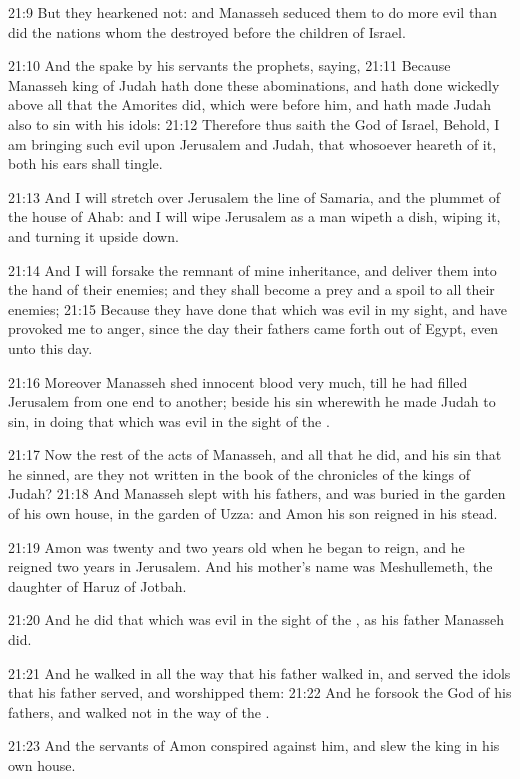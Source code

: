 21:9 But they hearkened not: and Manasseh seduced them to do more evil
than did the nations whom the \LORD destroyed before the children of
Israel.

21:10 And the \LORD spake by his servants the prophets, saying, 21:11
Because Manasseh king of Judah hath done these abominations, and hath
done wickedly above all that the Amorites did, which were before him,
and hath made Judah also to sin with his idols: 21:12 Therefore thus
saith the \LORD God of Israel, Behold, I am bringing such evil upon
Jerusalem and Judah, that whosoever heareth of it, both his ears shall
tingle.

21:13 And I will stretch over Jerusalem the line of Samaria, and the
plummet of the house of Ahab: and I will wipe Jerusalem as a man
wipeth a dish, wiping it, and turning it upside down.

21:14 And I will forsake the remnant of mine inheritance, and deliver
them into the hand of their enemies; and they shall become a prey and
a spoil to all their enemies; 21:15 Because they have done that which
was evil in my sight, and have provoked me to anger, since the day
their fathers came forth out of Egypt, even unto this day.

21:16 Moreover Manasseh shed innocent blood very much, till he had
filled Jerusalem from one end to another; beside his sin wherewith he
made Judah to sin, in doing that which was evil in the sight of the
\LORD.

21:17 Now the rest of the acts of Manasseh, and all that he did, and
his sin that he sinned, are they not written in the book of the
chronicles of the kings of Judah?  21:18 And Manasseh slept with his
fathers, and was buried in the garden of his own house, in the garden
of Uzza: and Amon his son reigned in his stead.

21:19 Amon was twenty and two years old when he began to reign, and he
reigned two years in Jerusalem. And his mother's name was
Meshullemeth, the daughter of Haruz of Jotbah.

21:20 And he did that which was evil in the sight of the \LORD, as his
father Manasseh did.

21:21 And he walked in all the way that his father walked in, and
served the idols that his father served, and worshipped them: 21:22
And he forsook the \LORD God of his fathers, and walked not in the way
of the \LORD.

21:23 And the servants of Amon conspired against him, and slew the
king in his own house.

